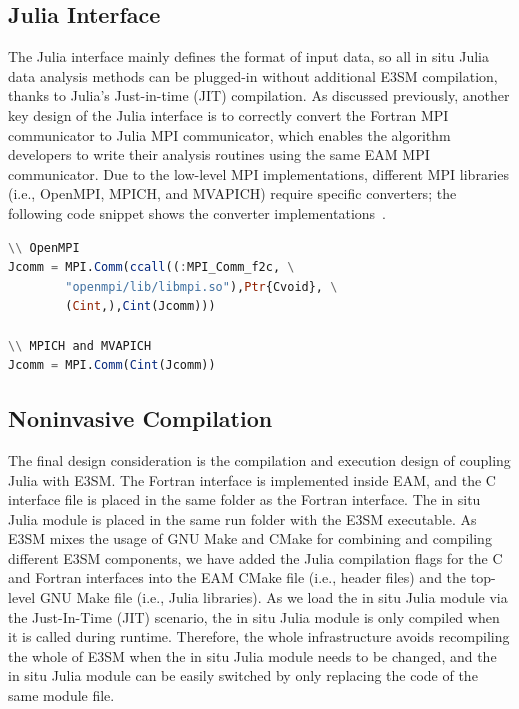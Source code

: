 \documentclass{juliacon}
\begin{document}
\subsection{Julia Interface}

The Julia interface mainly defines the format of input data, so all in situ Julia data analysis methods can be plugged-in without additional E3SM compilation, thanks to Julia's Just-in-time (JIT) compilation.
As discussed previously, another key design of the Julia interface is to correctly convert the Fortran MPI communicator to Julia MPI communicator, which enables the algorithm developers to write their analysis routines using the same EAM MPI communicator. Due to the low-level MPI implementations, different MPI libraries (i.e., OpenMPI, MPICH, and MVAPICH) require specific converters; the following code snippet shows the converter implementations~\cite{gabriel2004open,panda2021mvapich,gropp1996high}.

\begin{minipage}{\linewidth}
\begin{lstlisting}[language = Julia, caption={Juila interface MPI conversion.}]
\\ OpenMPI
Jcomm = MPI.Comm(ccall((:MPI_Comm_f2c, \
        "openmpi/lib/libmpi.so"),Ptr{Cvoid}, \
        (Cint,),Cint(Jcomm)))

\\ MPICH and MVAPICH
Jcomm = MPI.Comm(Cint(Jcomm))
\end{lstlisting}
\end{minipage}


\subsection{Noninvasive Compilation}
The final design consideration is the compilation and execution design of coupling Julia with E3SM. The Fortran interface is implemented inside EAM, and the C interface file is placed in the same folder as the Fortran interface. The in situ Julia module is placed in the same run folder with the E3SM executable. As E3SM mixes the usage of GNU Make and CMake for combining and compiling different E3SM components, we have added the Julia compilation flags for the C and Fortran interfaces into the EAM CMake file (i.e., header files) and the top-level GNU Make file (i.e., Julia libraries). As we load the in situ Julia module via the Just-In-Time (JIT) scenario, the in situ Julia module is only compiled when it is called during runtime. Therefore, the whole infrastructure avoids recompiling the whole of E3SM when the in situ Julia module needs to be changed, and the in situ Julia module can be easily switched by only replacing the code of the same module file.
\end{document}
